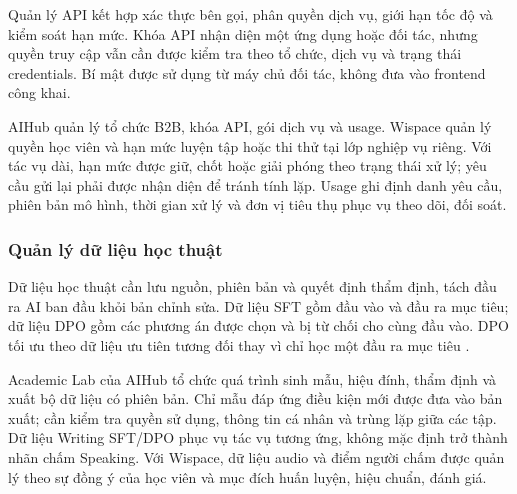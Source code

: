 Quản lý API kết hợp xác thực bên gọi, phân quyền dịch vụ, giới hạn tốc độ và kiểm soát hạn mức. Khóa API nhận diện một ứng dụng hoặc đối tác, nhưng quyền truy cập vẫn cần được kiểm tra theo tổ chức, dịch vụ và trạng thái credentials. Bí mật được sử dụng từ máy chủ đối tác, không đưa vào frontend công khai.

AIHub quản lý tổ chức B2B, khóa API, gói dịch vụ và usage. Wispace quản lý quyền học viên và hạn mức luyện tập hoặc thi thử tại lớp nghiệp vụ riêng. Với tác vụ dài, hạn mức được giữ, chốt hoặc giải phóng theo trạng thái xử lý; yêu cầu gửi lại phải được nhận diện để tránh tính lặp. Usage ghi định danh yêu cầu, phiên bản mô hình, thời gian xử lý và đơn vị tiêu thụ phục vụ theo dõi, đối soát.

\subsubsection{Quản lý dữ liệu học thuật}

Dữ liệu học thuật cần lưu nguồn, phiên bản và quyết định thẩm định, tách đầu ra AI ban đầu khỏi bản chỉnh sửa. Dữ liệu SFT gồm đầu vào và đầu ra mục tiêu; dữ liệu DPO gồm các phương án được chọn và bị từ chối cho cùng đầu vào. DPO tối ưu theo dữ liệu ưu tiên tương đối thay vì chỉ học một đầu ra mục tiêu \parencite{ch3_dpo}.

Academic Lab của AIHub tổ chức quá trình sinh mẫu, hiệu đính, thẩm định và xuất bộ dữ liệu có phiên bản. Chỉ mẫu đáp ứng điều kiện mới được đưa vào bản xuất; cần kiểm tra quyền sử dụng, thông tin cá nhân và trùng lặp giữa các tập. Dữ liệu Writing SFT/DPO phục vụ tác vụ tương ứng, không mặc định trở thành nhãn chấm Speaking. Với Wispace, dữ liệu audio và điểm người chấm được quản lý theo sự đồng ý của học viên và mục đích huấn luyện, hiệu chuẩn, đánh giá.
